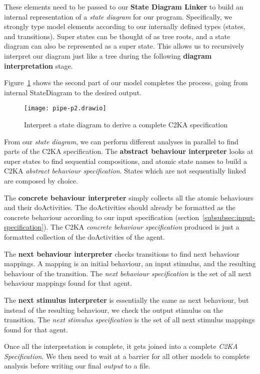 These elements need to be passed to our \textbf{State Diagram Linker}
to build an internal representation of a \textit{state diagram} for our program.
Specifically, we strongly type model elements according to our internally defined types (states, and transitions).
Super states can be thought of as tree roots, and a state diagram can also be represented as a super state.
This allows us to recursively interpret our diagram just like a tree during the following \textbf{diagram interpretation} stage.

Figure~\ref{fig:pipe-2} shows the  second part of our model completes the process, going from internal StateDiagram to the desired output.
\begin{figure}[h]
    \centering
    \texttt{[image: pipe-p2.drawio]}
    \caption{Interpret a state diagram to derive a complete C2KA specification}
    \label{fig:pipe-2}
\end{figure}

From our \textit{state diagram}, we can perform different analyses in parallel to find parts of the C2KA specification.
The \textbf{abstract behaviour interpreter} looks at super states to find sequential compositions,
and atomic state names to build a C2KA \textit{abstract behaviour specification}.
States which are not sequentially linked are composed by choice.

The \textbf{concrete behaviour interpreter} simply collects all the atomic behaviours and their doActivities.
The doActivities should already be formatted as the concrete behaviour according to our input specification (section~\ref{subsubsec:input-specification}).
The C2KA \textit{concrete behaviour specification} produced is just a formatted collection of the doActivities of the agent.

The \textbf{next behaviour interpreter} checks transitions to find next behaviour mappings.
A mapping is an initial behaviour, an input stimulus, and the resulting behaviour of the transition.
The \textit{next behaviour specification} is the set of all next behaviour mappings found for that agent.

The \textbf{next stimulus interpreter} is essentially the same as next behaviour,
but instead of the resulting behaviour, we check the output stimulus on the transition.
The \textit{next stimulus specification} is the set of all next stimulus mappings found for that agent.

Once all the interpretation is complete, it gets joined into a complete \textit{C2KA Specification}.
We then need to wait at a barrier for all other models to complete analysis before writing our final \textit{output} to a file.

